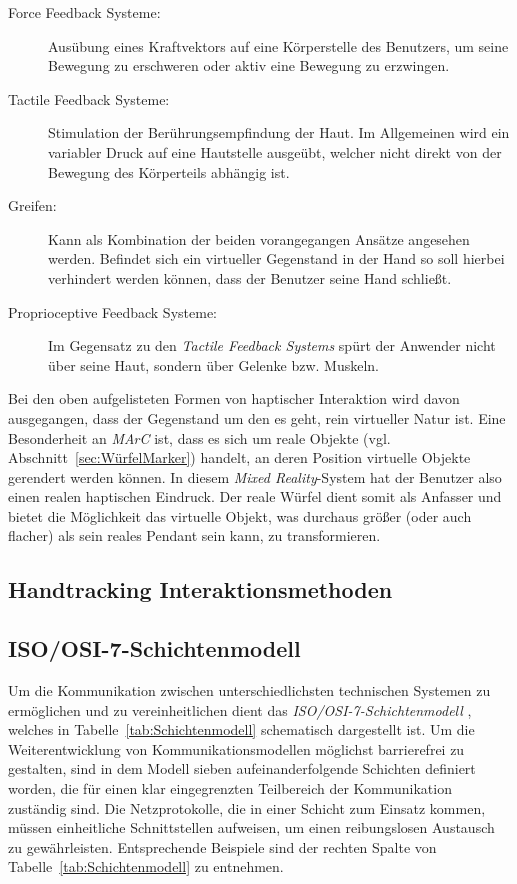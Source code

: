 \begin{description}
	\item[Force Feedback Systeme:] Ausübung eines Kraftvektors auf eine Körperstelle des Benutzers, um seine Bewegung zu erschweren oder aktiv eine Bewegung zu erzwingen. %
	\item[Tactile Feedback Systeme:] Stimulation der Berührungsempfindung der Haut. Im Allgemeinen wird ein variabler Druck auf eine Hautstelle ausgeübt, welcher nicht direkt von der Bewegung des Körperteils abhängig ist.
	\item[Greifen:] Kann als Kombination der beiden vorangegangen Ansätze angesehen werden. Befindet sich ein virtueller Gegenstand in der Hand so soll hierbei verhindert werden können, dass der Benutzer seine Hand schließt. 
	\item[Proprioceptive Feedback Systeme:] Im Gegensatz zu den \textit{Tactile Feedback Systems} spürt der Anwender nicht über seine Haut, sondern über Gelenke bzw. Muskeln. 
\end{description}

Bei den oben aufgelisteten Formen von haptischer Interaktion wird davon ausgegangen, dass der Gegenstand um den es geht, rein virtueller Natur ist. Eine Besonderheit an \textit{MArC} ist, dass es sich um reale Objekte (vgl. Abschnitt~\ref{sec:WürfelMarker}) handelt, an deren Position virtuelle Objekte gerendert werden können. In diesem \textit{Mixed Reality}-System hat der Benutzer also einen realen haptischen Eindruck. Der reale Würfel dient somit als Anfasser und bietet die Möglichkeit das virtuelle Objekt, was durchaus größer (oder auch flacher) als sein reales Pendant sein kann, zu transformieren. 



\subsection{Handtracking Interaktionsmethoden}\label{sec:HandtrackingAnwendungen}
\subsection{ISO/OSI-7-Schichtenmodell}\label{sec:Netzwerk}
Um die Kommunikation zwischen unterschiedlichsten technischen Systemen zu ermöglichen und zu vereinheitlichen dient das \textit{ISO/OSI-7-Schichtenmodell} \cite{ITU}, welches in Tabelle~\ref{tab:Schichtenmodell} schematisch dargestellt ist. Um die Weiterentwicklung von Kommunikationsmodellen möglichst barrierefrei zu gestalten, sind in dem Modell sieben aufeinanderfolgende Schichten definiert worden, die für einen klar eingegrenzten Teilbereich der Kommunikation zuständig sind. Die Netzprotokolle, die in einer Schicht zum Einsatz kommen, müssen einheitliche Schnittstellen aufweisen, um einen reibungslosen Austausch zu gewährleisten. Entsprechende Beispiele sind der rechten Spalte von Tabelle~\ref{tab:Schichtenmodell} zu entnehmen.\\

